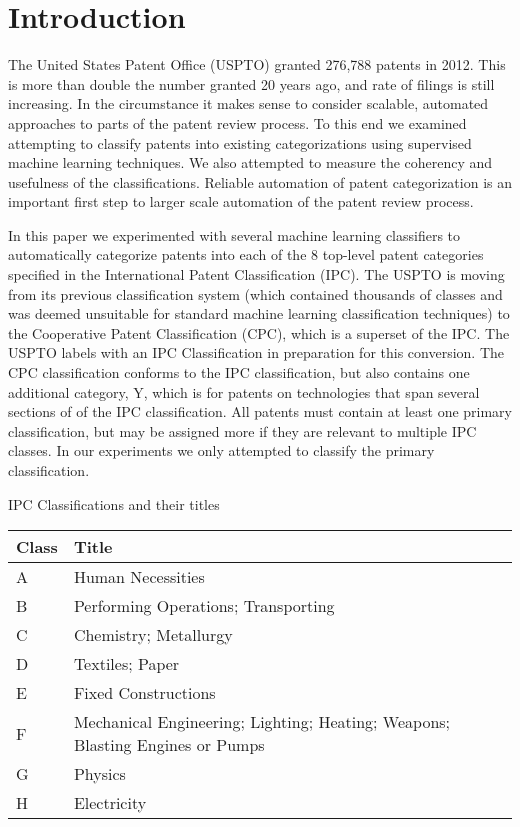 \section{Introduction}
\indent
The United States Patent Office (USPTO) granted 276,788 patents in 2012\cite{USPTO:2013:stats}. This is more than double the number granted 20 years ago, and rate of filings is still increasing. In the circumstance it makes sense to consider scalable, automated approaches to parts of the patent review process. To this end we examined attempting to classify patents into existing categorizations using supervised machine learning techniques. We also attempted to measure the coherency and usefulness of the classifications. Reliable automation of patent categorization is an important first step to larger scale automation of the patent review process.

In this paper we experimented with several machine learning classifiers to automatically categorize patents into each of the 8 top-level patent categories specified in the International Patent Classification\cite{ipc:2013:guide} (IPC). The USPTO is moving from its previous classification system (which contained thousands of classes and was deemed unsuitable for standard machine learning classification techniques) to the Cooperative Patent Classification (CPC), which is a superset of the IPC. The USPTO labels with an IPC Classification in preparation for this conversion. The CPC classification conforms to the IPC classification, but also contains one additional category, Y, which is for patents on technologies that span several sections of of the IPC classification. All patents must contain at least one primary classification, but may be assigned more if they are relevant to multiple IPC classes. In our experiments we only attempted to classify the primary classification.



\begin{tablehere}
	\centering
	\caption{IPC Classifications and their titles}
	\begin{tabular}{ | l | l |}
		\hline
		\textbf{Class} & \textbf{Title} \\
				\hline
		A & Human Necessities \\
				\hline
		B & Performing Operations; Transporting \\
				\hline
		C & Chemistry; Metallurgy \\
				\hline
		D & Textiles; Paper \\
				\hline
		E & Fixed Constructions \\
				\hline
		F & Mechanical Engineering; Lighting; Heating; Weapons; Blasting Engines or Pumps \\
		\hline
		G & Physics \\
				\hline
		H & Electricity \\
				\hline
	\end{tabular}
	
\end{tablehere}



